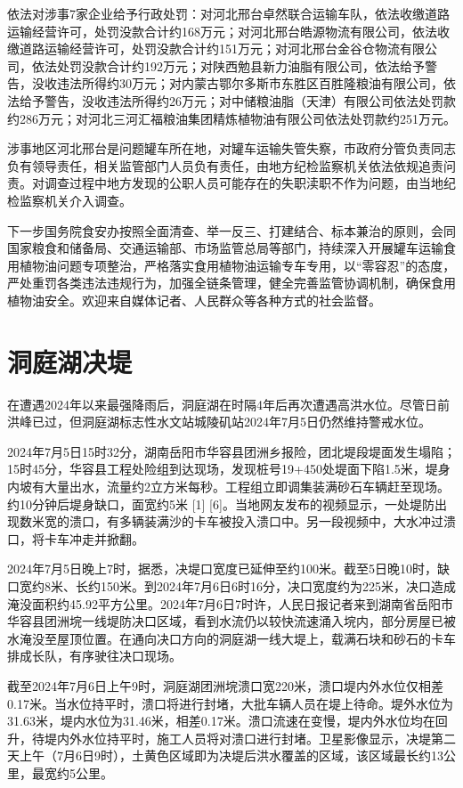 依法对涉事7家企业给予行政处罚：对河北邢台卓然联合运输车队，依法收缴道路运输经营许可，处罚没款合计约168万元；对河北邢台皓源物流有限公司，依法收缴道路运输经营许可，处罚没款合计约151万元；对河北邢台金谷仓物流有限公司，依法处罚没款合计约192万元；对陕西勉县新力油脂有限公司，依法给予警告，没收违法所得约30万元；对内蒙古鄂尔多斯市东胜区百胜隆粮油有限公司，依法给予警告，没收违法所得约26万元；对中储粮油脂（天津）有限公司依法处罚款约286万元；对河北三河汇福粮油集团精炼植物油有限公司依法处罚款约251万元。

涉事地区河北邢台是问题罐车所在地，对罐车运输失管失察，市政府分管负责同志负有领导责任，相关监管部门人员负有责任，由地方纪检监察机关依法依规追责问责。对调查过程中地方发现的公职人员可能存在的失职渎职不作为问题，由当地纪检监察机关介入调查。

下一步国务院食安办按照全面清查、举一反三、打建结合、标本兼治的原则，会同国家粮食和储备局、交通运输部、市场监管总局等部门，持续深入开展罐车运输食用植物油问题专项整治，严格落实食用植物油运输专车专用，以“零容忍”的态度，严处重罚各类违法违规行为，加强全链条管理，健全完善监管协调机制，确保食用植物油安全。欢迎来自媒体记者、人民群众等各种方式的社会监督。

\section{洞庭湖决堤}

在遭遇2024年以来最强降雨后，洞庭湖在时隔4年后再次遭遇高洪水位。尽管日前洪峰已过，但洞庭湖标志性水文站城陵矶站2024年7月5日仍然维持警戒水位。

2024年7月5日15时32分，湖南岳阳市华容县团洲乡报险，团北堤段堤面发生塌陷；15时45分，华容县工程处险组到达现场，发现桩号19+450处堤面下陷1.5米，堤身内坡有大量出水，流量约2立方米每秒。工程组立即调集装满砂石车辆赶至现场。约10分钟后堤身缺口，面宽约5米 [1] [6]。当地网友发布的视频显示，一处堤防出现数米宽的溃口，有多辆装满沙的卡车被投入溃口中。另一段视频中，大水冲过溃口，将卡车冲走并掀翻。

2024年7月5日晚上7时，据悉，决堤口宽度已延伸至约100米。截至5日晚10时，缺口宽约8米、长约150米。到2024年7月6日6时16分，决口宽度约为225米，决口造成淹没面积约45.92平方公里。2024年7月6日7时许，人民日报记者来到湖南省岳阳市华容县团洲垸一线堤防决口区域，看到水流仍以较快流速涌入垸内，部分房屋已被水淹没至屋顶位置。在通向决口方向的洞庭湖一线大堤上，载满石块和砂石的卡车排成长队，有序驶往决口现场。

截至2024年7月6日上午9时，洞庭湖团洲垸溃口宽220米，溃口堤内外水位仅相差0.17米。当水位持平时，溃口将进行封堵，大批车辆人员在堤上待命。堤外水位为31.63米，堤内水位为31.46米，相差0.17米。溃口流速在变慢，堤内外水位均在回升，待堤内外水位持平时，施工人员将对溃口进行封堵。卫星影像显示，决堤第二天上午（7月6日9时），土黄色区域即为决堤后洪水覆盖的区域，该区域最长约13公里，最宽约5公里。

